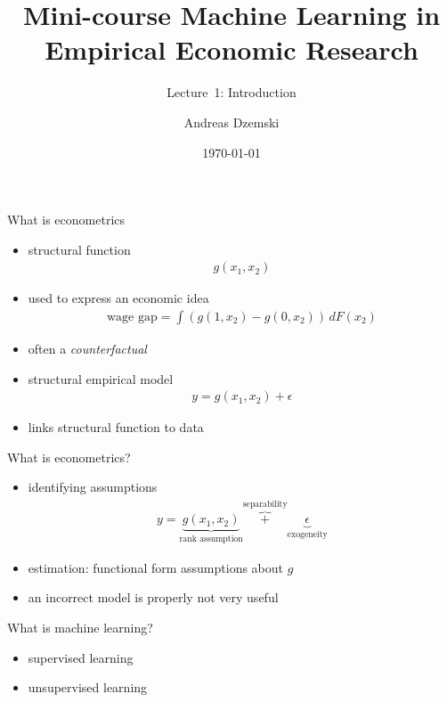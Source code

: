 \documentclass[xcolor=dvipsnames, handout]{beamer}
\author[Dzemski]{Andreas Dzemski\inst{1}}
\institute{\inst{1} University of Gothenburg}
\title{Mini-course Machine Learning in Empirical Economic Research}
\date{\today}
\subtitle{Lecture~1: Introduction}
\begin{document}
\maketitle

\begin{frame}{What is econometrics}
\pause
\begin{itemize}
  \item structural function
  \begin{align*}
    g(x_1, x_2)
  \end{align*}
  \item used to express an economic idea
  \begin{align*}
    \text{wage gap} = \int \left(g(1, x_2) - g(0, x_2)\right) \, dF(x_2)
  \end{align*}
  \item often a \emph{counterfactual}
  \item structural empirical model
  \begin{align*}
    y = g(x_1, x_2) + \epsilon
  \end{align*}
  \item links structural function to data
\end{itemize}
\end{frame}

\begin{frame}{What is econometrics?}
  \begin{itemize}
    \item identifying assumptions
      \begin{align*}
        y = \underbrace{g(x_1, x_2)}_{\text{rank assumption}} \overbrace{+}^{\text{separability}} \underbrace{\epsilon}_{\text{exogeneity}}
      \end{align*}
    \item estimation: functional form assumptions about $g$
    \item an incorrect model is properly not very useful
  \end{itemize}
\end{frame}


\begin{frame}{What is machine learning?}
\pause
\begin{itemize}
  \item supervised learning
  \item unsupervised learning
\end{itemize}
\end{frame}
\end{document}
